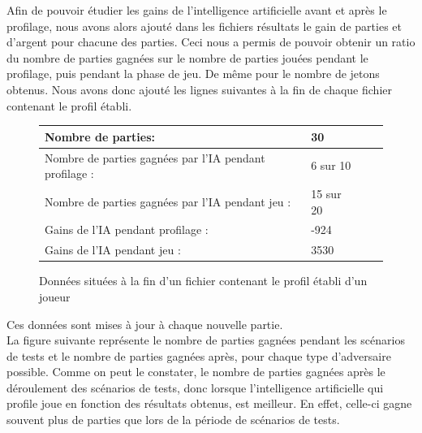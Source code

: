 \documentclass{report}
\begin{document}
\hspace{0.5cm}Afin de pouvoir étudier les gains de l'intelligence artificielle avant et après le profilage, nous avons alors ajouté dans les fichiers résultats le gain de parties et d'argent pour chacune des parties. Ceci nous a permis de pouvoir obtenir un ratio du nombre de parties gagnées sur le nombre de parties jouées pendant le profilage, puis pendant la phase de jeu. De même pour le nombre de jetons obtenus. Nous avons donc ajouté les lignes suivantes à la fin de chaque fichier contenant le profil établi.\\

\begin{figure}[H]
\begin{center}
\begin{tabular}{|l|l|l|l|}
\hline
Nombre de parties:&	30		\\
\hline
Nombre de parties gagnées par l'IA pendant profilage :& 6 sur 10\\
\hline
Nombre de parties gagnées par l'IA pendant jeu :& 15 sur 20\\
\hline
Gains de l'IA pendant profilage :& -924		\\
\hline
Gains de l'IA pendant jeu :&	3530		\\
\hline
\end{tabular}
\end{center}
\caption{Données situées à la fin d'un fichier contenant le profil établi d'un joueur}
\end{figure}

Ces données sont mises à jour à chaque nouvelle partie.\\


La figure suivante représente le nombre de parties gagnées pendant les scénarios de tests et le nombre de parties gagnées après, pour chaque type d'adversaire possible. Comme on peut le constater, le nombre de parties gagnées après le déroulement des scénarios de tests, donc lorsque l'intelligence artificielle qui profile joue en fonction des résultats obtenus, est meilleur. En effet, celle-ci gagne souvent plus de parties que lors de la période de scénarios de tests. \\
\end{document}
